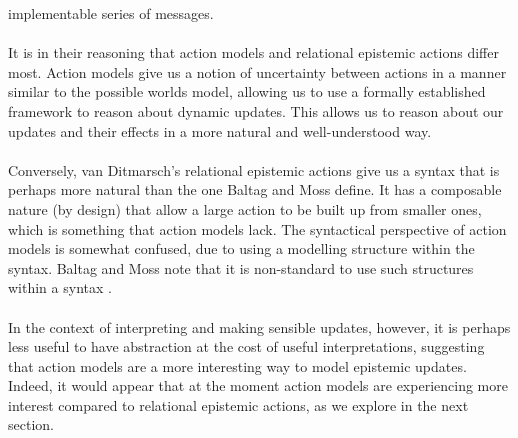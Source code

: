 implementable series of messages.\\
\\
It is in their reasoning that action models and relational epistemic actions
differ most.
Action models give us a notion of uncertainty between actions in a manner
similar to the possible worlds model, allowing us to use a formally established framework
to reason about dynamic updates.
This allows us to reason about our updates and their effects in a more natural
and well-understood way.\\
\\
Conversely, van Ditmarsch's relational epistemic actions give us a syntax that
is perhaps more natural than the one Baltag and Moss define.
It has a composable nature (by design) that allow a large action to be built up from smaller ones, which is
something that action models lack.
The syntactical perspective of action models is somewhat confused, due to using a modelling
structure within the syntax.
Baltag and Moss note that it is non-standard to use such structures
within a syntax \cite{baltag2005programs}.\\
\\
In the context of interpreting and making sensible updates, however, it is
perhaps less useful to have abstraction at the cost of useful interpretations,
suggesting that action models are a more interesting way to model epistemic
updates.
Indeed, it would appear that at the moment action models are experiencing more
interest compared to relational epistemic actions, as we explore in the next
section.

